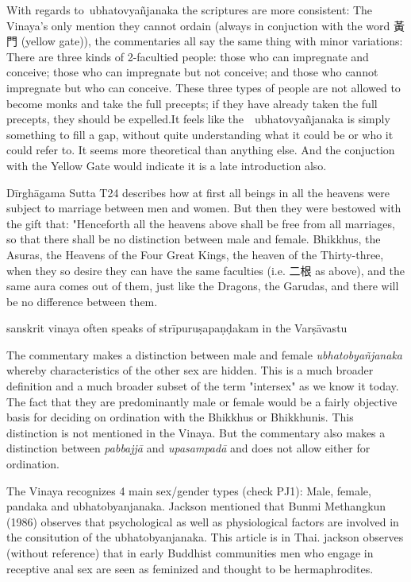 With regards to ubhatovyañjanaka the scriptures are more consistent: The Vinaya's only mention they cannot ordain (always in conjuction with the word 黃門 (yellow gate)), the commentaries all say the same thing with minor variations: There are three kinds of 2-facultied people: those who can impregnate and conceive; those who can impregnate but not conceive; and those who cannot impregnate but who can conceive. These three types of people are not allowed to become monks and take the full precepts; if they have already taken the full precepts, they should be expelled.It feels like the  ubhatovyañjanaka is simply something to fill a gap, without quite understanding what it could be or who it could refer to. It seems more theoretical than anything else. And the conjuction with the Yellow Gate would indicate it is a late introduction also.

Dīrghāgama Sutta T24 describes how at first all beings in all the heavens were subject to marriage between men and women. But then they were bestowed with the gift that:
"Henceforth all the heavens above shall be free from all marriages, so that there shall be no distinction between male and female. Bhikkhus, the Asuras, the Heavens of the Four Great Kings, the heaven of the Thirty-three, when they so desire they can have the same faculties (i.e. 二根 as above), and the same aura comes out of them, just like the Dragons, the Garudas, and there will be no difference between them.


sanskrit vinaya often speaks of strīpuruṣapaṇḍakam in the Varṣāvastu

The commentary makes a distinction between male and female {\em ubhatob­yañ­janaka} whereby characteristics of the other sex are hidden. This is a much broader definition and a much broader subset of the term "intersex" as we know it today. The fact that they are predominantly male or female would be a fairly objective basis for deciding on ordination with the Bhikkhus or Bhikkhunis. This distinction is not mentioned in the Vinaya. But the commentary also makes a distinction between {\em pabbajjā} and {\em upasampadā} and does not allow either for ordination.


The Vinaya recognizes 4 main sex/gender types (check PJ1): Male, female, pandaka and ubhatobyanjanaka. 
Jackson mentioned that Bunmi Methangkun (1986) observes that psychological as well as physiological factors are involved in the consitution of the ubhatobyanjanaka. This article is in Thai.
jackson observes (without reference) that in early Buddhist communities men who engage in receptive anal sex are seen as feminized and thought to be hermaphrodites.



